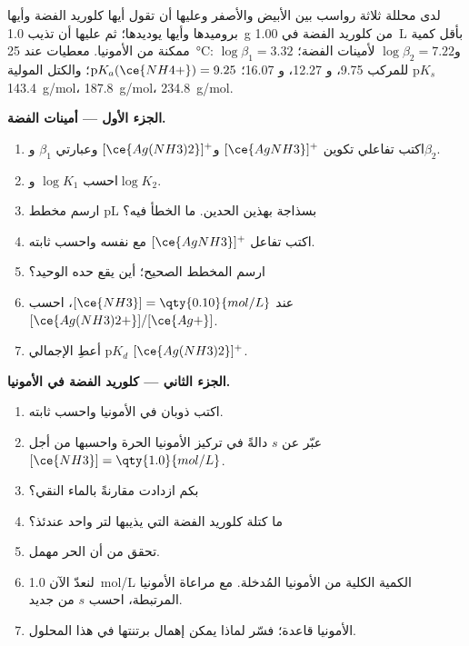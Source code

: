 \begin{problem}
\label{pb:b1:complexation:1}
لدى محللة ثلاثة رواسب بين الأبيض والأصفر وعليها أن تقول أيها
كلوريد الفضة وأيها بروميدها وأيها يوديدها؛ ثم عليها أن
تذيب \qty{1.0}{g} من كلوريد الفضة في \qty{1.00}{L} بأقل
كمية ممكنة من الأمونيا. معطيات عند \qty{25}{\celsius}: $\log\beta_1 = 3.32$
و$\log\beta_2 = 7.22$ لأمينات الفضة؛ $\mathrm{p}K_s$ للمركب 
9.75، و 12.27، و 16.07؛ $\mathrm{p}K_a(\ce{NH4+}) = 9.25$؛
والكتل المولية  \qty{143.4}{g/mol}،  \qty{187.8}{g/mol}،
 \qty{234.8}{g/mol}.

\medskip
\noindent\textbf{الجزء الأول --- أمينات الفضة.}
\begin{enumerate}
  \item اكتب تفاعلي تكوين $[\ce{AgNH3}]^{+}$
        و$[\ce{Ag(NH3)2}]^{+}$ وعبارتي $\beta_1$ و$\beta_2$.
  \item احسب $\log K_1$ و$\log K_2$.
  \item ارسم مخطط pL بسذاجة بهذين الحدين. ما الخطأ
        فيه؟
  \item اكتب تفاعل $[\ce{AgNH3}]^{+}$ مع نفسه واحسب
        ثابته.
  \item ارسم المخطط الصحيح؛ أين يقع حده الوحيد؟
  \item عند $[\ce{NH3}] = \qty{0.10}{mol/L}$، احسب
        $[\ce{Ag(NH3)2+}]/[\ce{Ag+}]$.
  \item أعطِ  الإجمالي $\mathrm{p}K_d$ 
        $[\ce{Ag(NH3)2}]^{+}$.
\end{enumerate}

\medskip
\noindent\textbf{الجزء الثاني --- كلوريد الفضة في الأمونيا.}
\begin{enumerate}[resume]
  \item اكتب ذوبان  في الأمونيا واحسب
        ثابته.
  \item عبّر عن  $s$ دالةً في تركيز الأمونيا الحرة
        واحسبها من أجل $[\ce{NH3}] = \qty{1.0}{mol/L}$.
  \item بكم ازدادت  مقارنةً بالماء
        النقي؟
  \item ما كتلة كلوريد الفضة التي يذيبها لتر واحد عندئذ؟
  \item تحقق من أن  الحر مهمل.
  \item لنعدّ الآن \qty{1.0}{mol/L} الكمية الكلية من الأمونيا المُدخلة. مع
        مراعاة الأمونيا المرتبطة، احسب $s$ من جديد.
  \item الأمونيا قاعدة؛ فسّر لماذا يمكن إهمال برتنتها في
        هذا المحلول.
\end{enumerate}


\end{problem}
